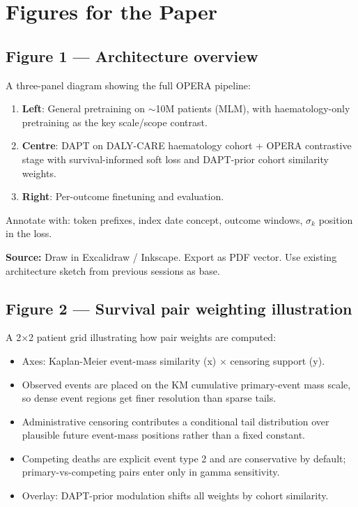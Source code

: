 \documentclass[11pt, a4paper]{article}
\begin{document}
\section{Figures for the Paper}

\subsection{Figure 1 — Architecture overview}

A three-panel diagram showing the full OPERA pipeline:
\begin{enumerate}[leftmargin=2em, itemsep=2pt]
  \item \textbf{Left}: General pretraining on $\sim$10M patients (MLM),
        with haematology-only pretraining as the key scale/scope contrast.
  \item \textbf{Centre}: DAPT on DALY-CARE haematology cohort +
        OPERA contrastive stage with survival-informed soft loss and
        DAPT-prior cohort similarity weights.
  \item \textbf{Right}: Per-outcome finetuning and evaluation.
\end{enumerate}
Annotate with: token prefixes, index date concept, outcome windows,
$\sigma_k$ position in the loss.

\medskip
\begin{tcolorbox}[notebox]
  \textbf{Source:} Draw in Excalidraw / Inkscape. Export as PDF vector.
  Use existing architecture sketch from previous sessions as base.
\end{tcolorbox}

\subsection{Figure 2 — Survival pair weighting illustration}

A 2×2 patient grid illustrating how pair weights are computed:
\begin{itemize}[leftmargin=2em, itemsep=1pt]
  \item Axes: Kaplan-Meier event-mass similarity (x) $\times$ censoring support (y).
  \item Observed events are placed on the KM cumulative primary-event mass
        scale, so dense event regions get finer resolution than sparse tails.
  \item Administrative censoring contributes a conditional tail distribution
        over plausible future event-mass positions rather than a fixed constant.
  \item Competing deaths are explicit event type 2 and are conservative by
        default; primary-vs-competing pairs enter only in gamma sensitivity.
  \item Overlay: DAPT-prior modulation shifts all weights by cohort similarity.
\end{itemize}
\end{document}

